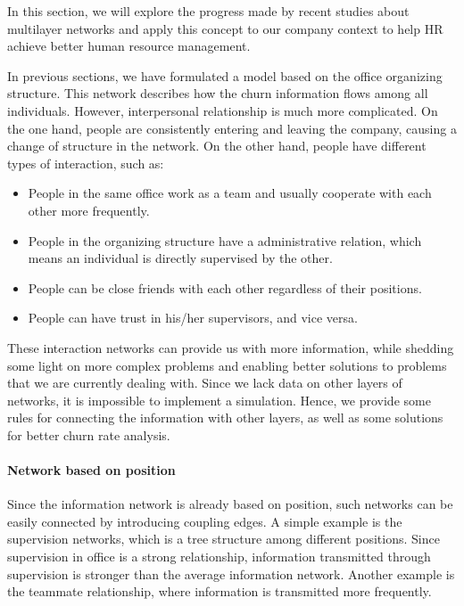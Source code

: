 \documentclass[tcn = 37075, sheet = false, abstract = false]{mcmthesis}
\begin{document}
In this section, we will explore the progress made by recent studies about multilayer networks and apply this concept to our company context to help HR achieve better human resource management.

In previous sections, we have formulated a model based on the office organizing structure. This network describes how the churn information flows among all individuals. However,  interpersonal relationship is much more complicated. On the one hand, people are consistently entering and leaving the company, causing a change of structure in the network. On the other hand, people have different types of interaction, such as:
\begin{itemize}
\item People in the same office work as a team and usually cooperate with each other more frequently. 
\item People in the organizing structure have a administrative relation, which means an individual is directly supervised by the other.
\item People can be close friends with each other regardless of their positions.
\item People can have trust in his/her supervisors, and vice versa.
\end{itemize}

These interaction networks can provide us with more information, while shedding some light on more complex problems and enabling better solutions to problems that we are currently dealing with. Since we lack data on other layers of networks, it is impossible to implement a simulation. Hence, we provide some rules for connecting the information with other layers, as well as some solutions for better churn rate analysis.

\paragraph{Network based on position} Since the information network is already based on position, such networks can be easily connected by introducing coupling edges. A simple example is the supervision networks, which is a tree structure among different positions. Since supervision in office is a strong relationship, information transmitted through supervision is stronger than the average information network. Another example is the teammate relationship, where information is transmitted more frequently.
\end{document}
